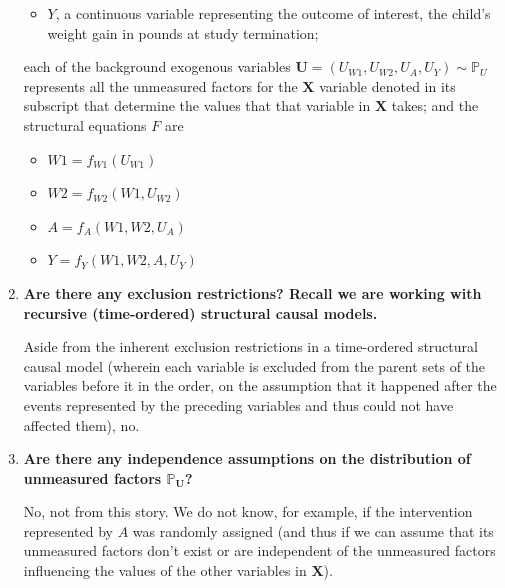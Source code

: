 \documentclass{article}\usepackage[]{graphicx}\usepackage[]{xcolor}
\begin{document}
\begin{enumerate}[label=\textbf{\alph*.}]
\begin{itemize}
      \item $Y$, a continuous variable representing the outcome of interest, the child's weight gain in pounds at study termination;
      
    \end{itemize}
    
    each of the background exogenous variables $\bm{U} = (U_{W1}, U_{W2}, U_{A}, U_{Y}) \sim \mathbb{P}_U$ represents all the unmeasured factors for the $\bm{X}$ variable denoted in its subscript that determine the values that that variable in $\bm{X}$ takes; and the structural equations $F$ are
    
    \begin{itemize}
    
      \item $W1 = f_{W1}(U_{W1})$
      
      \item $W2 = f_{W2}(W1, U_{W2})$
      
      \item $A = f_{A}(W1, W2, U_{A})$
      
      \item $Y = f_{Y}(W1, W2, A, U_{Y})$
      
    \end{itemize}


    \item \textbf{Are there any exclusion restrictions? Recall we are working with recursive (time-ordered) structural causal models.}
    
    Aside from the inherent exclusion restrictions in a time-ordered structural causal model (wherein each variable is excluded from the parent sets of the variables before it in the order, on the assumption that it happened after the events represented by the preceding variables and thus could not have affected them), no.
    
    \item \textbf{Are there any independence assumptions on the distribution of unmeasured factors $\mathbb{P}_{\bm{U}}$?}
    
    No, not from this story. We do not know, for example, if the intervention represented by $A$ was randomly assigned (and thus if we can assume that its unmeasured factors don't exist or are independent of the unmeasured factors influencing the values of the other variables in $\bm{X}$).

  \end{enumerate}
  
\end{document}
